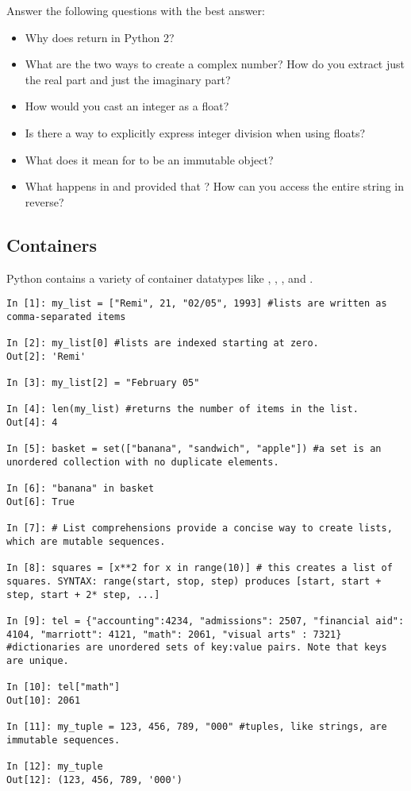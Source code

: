 \begin{problem}
Answer the following questions with the best answer:
\begin{itemize}
\item Why does  return  in Python 2? 
\item What are the two ways to create a complex number? 
How do you extract just the real part and just the imaginary part?
\item How would you cast an integer as a float?
\item Is there a way to explicitly express integer division when using floats?
\item What does it mean for  to be an immutable object? 
\item What happens in  and  provided 
that ? 
How can you access the entire string in reverse?

\end{itemize}
\end{problem}


\subsection*{Containers}

\begin{example}
Python contains a variety of container datatypes like , , 
, and .

\begin{lstlisting}
In [1]: my_list = ["Remi", 21, "02/05", 1993] #lists are written as comma-separated items 

In [2]: my_list[0] #lists are indexed starting at zero.
Out[2]: 'Remi'

In [3]: my_list[2] = "February 05"

In [4]: len(my_list) #returns the number of items in the list.
Out[4]: 4

In [5]: basket = set(["banana", "sandwich", "apple"]) #a set is an unordered collection with no duplicate elements. 

In [6]: "banana" in basket
Out[6]: True

In [7]: # List comprehensions provide a concise way to create lists, which are mutable sequences. 

In [8]: squares = [x**2 for x in range(10)] # this creates a list of squares. SYNTAX: range(start, stop, step) produces [start, start + step, start + 2* step, ...]

In [9]: tel = {"accounting":4234, "admissions": 2507, "financial aid": 4104, "marriott": 4121, "math": 2061, "visual arts" : 7321} #dictionaries are unordered sets of key:value pairs. Note that keys are unique.

In [10]: tel["math"]
Out[10]: 2061

In [11]: my_tuple = 123, 456, 789, "000" #tuples, like strings, are immutable sequences. 

In [12]: my_tuple
Out[12]: (123, 456, 789, '000')



\end{lstlisting}
\end{example}


